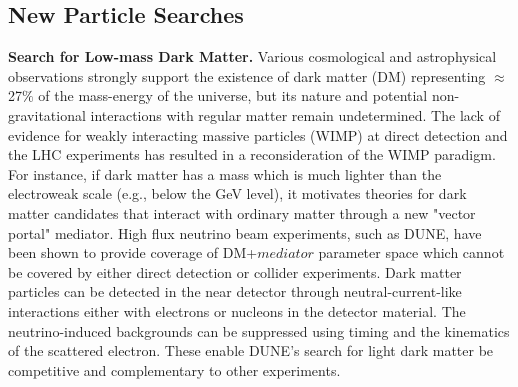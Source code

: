 \subsection{New Particle Searches}
{\bf Search for Low-mass Dark Matter.}
Various cosmological and astrophysical observations strongly support the existence of dark matter (DM) representing $\approx$27$\%$ of the mass-energy of the universe, but its nature and potential non-gravitational interactions with regular matter remain undetermined. 
The lack of evidence for weakly interacting massive particles (WIMP) at direct detection and the LHC experiments has resulted in a reconsideration of the WIMP paradigm. For instance, if  dark matter has a mass which is much lighter than the electroweak scale (e.g., below the GeV level), it motivates theories for  dark matter candidates that interact with ordinary matter through a new "vector portal" mediator.
High flux neutrino beam experiments, such as DUNE, have been shown to provide coverage of DM+$mediator$ parameter space which cannot be covered by either direct detection or collider experiments. %
Dark
matter particles can be detected in the near detector through neutral-current-like interactions 
either with electrons or nucleons in the detector material.
The neutrino-induced backgrounds can be suppressed using timing and the kinematics of the scattered electron.
These enable DUNE's search for light dark matter be competitive and complementary to other experiments.\\

